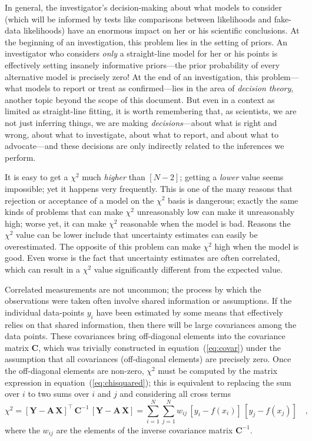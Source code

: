 \documentclass[12pt,twoside]{article}
\newcommand{\documentname}{document}
\newcommand{\equationname}{equation}
\newcounter{problem}
\newcommand{\mmatrix}[1]{\boldsymbol{#1}}
\newcommand{\inverse}[1]{{#1}^{-1}}
\newcommand{\transpose}[1]{{#1}^{\scriptscriptstyle \top}}
\newcommand{\mA}{\mmatrix{A}}
\newcommand{\mC}{\mmatrix{C}}
\newcommand{\mCinv}{\inverse{\mC}}
\newcommand{\mX}{\mmatrix{X}}
\newcommand{\mY}{\mmatrix{Y}}
\begin{document}
{  In general, the investigator's decision-making about what models to
  consider (which will be informed by tests like comparisons between
  likelihoods and fake-data likelihoods) have an enormous impact on
  her or his scientific conclusions.  At the beginning of an
  investigation, this problem lies in the setting of priors.  An
  investigator who considers \emph{only} a straight-line model for her
  or his points is effectively setting insanely informative
  priors---the prior probability of every alternative model is
  precisely zero!  At the end of an investigation, this problem---what
  models to report or treat as confirmed---lies in the area of
  \emph{decision theory}, another topic beyond the scope of this
  \documentname.  But even in a context as limited as straight-line
  fitting, it is worth remembering that, as scientists, we are not
  just inferring things, we are making \emph{decisions}---about what
  is right and wrong, about what to investigate, about what to report,
  and about what to advocate---and these decisions are only indirectly
  related to the inferences we perform.}

It is easy to get a $\chi^2$ much \emph{higher} than $[N-2]$; getting
a \emph{lower} value seems impossible; yet it happens very frequently.
This is one of the many reasons that rejection or acceptance of a
model on the $\chi^2$ basis is dangerous; exactly the same kinds of
problems that can make $\chi^2$ unreasonably low can make it
unreasonably high; worse yet, it can make $\chi^2$ reasonable when the
model is bad.  Reasons the $\chi^2$ value can be lower include that
uncertainty estimates can easily be overestimated. The opposite of
this problem can make $\chi^2$ high when the model is good. Even worse
is the fact that uncertainty estimates are often correlated, which can
result in a $\chi^2$ value significantly different from the expected
value.

Correlated measurements are not uncommon; the process by which the
observations were taken often involve shared information or
assumptions. If the individual data-points $y_i$ have been estimated
by some means that effectively relies on that shared information, then
there will be large covariances among the data points.  These
covariances bring off-diagonal elements into the covariance matrix
$\mC$, which was trivially constructed in
\equationname~(\ref{eq:covar}) under the assumption that all
covariances (off-diagonal elements) are precisely zero.  Once the
off-diagonal elements are non-zero, $\chi^2$ must be computed by the
matrix expression in \equationname~(\ref{eq:chisquared}); this is
equivalent to replacing the sum over $i$ to two sums over $i$ and $j$
and considering all cross terms
\begin{equation}
\chi^2 =
 \transpose{\left[\mY-\mA\,\mX\right]}\,\mCinv\,\left[\mY-\mA\,\mX\right]
 = \sum_{i=1}^N \sum_{j=1}^N
 w_{ij}\,\left[y_i-f(x_i)\right]\,\left[y_j-f(x_j)\right]
 \quad,
\end{equation} 
where the $w_{ij}$ are the elements of the inverse covariance
matrix $\inverse{\mC}$.
\end{document}
